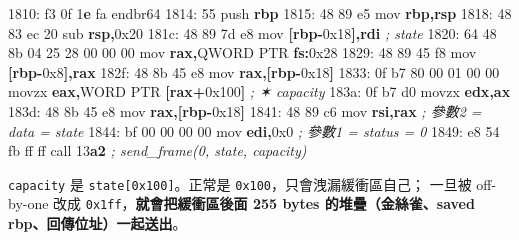\documentclass[10pt,a4paper]{article}
\newenvironment{Shaded}{\begin{snugshade}}{\end{snugshade}}
\newcommand{\BaseNTok}[1]{\textcolor[rgb]{0.00,0.00,0.81}{#1}}
\newcommand{\BuiltInTok}[1]{#1}
\newcommand{\CommentTok}[1]{\textcolor[rgb]{0.56,0.35,0.01}{\textit{#1}}}
\newcommand{\DataTypeTok}[1]{\textcolor[rgb]{0.13,0.29,0.53}{#1}}
\newcommand{\DecValTok}[1]{\textcolor[rgb]{0.00,0.00,0.81}{#1}}
\newcommand{\ErrorTok}[1]{\textcolor[rgb]{0.64,0.00,0.00}{\textbf{#1}}}
\newcommand{\FloatTok}[1]{\textcolor[rgb]{0.00,0.00,0.81}{#1}}
\newcommand{\KeywordTok}[1]{\textcolor[rgb]{0.13,0.29,0.53}{\textbf{#1}}}
\newcommand{\NormalTok}[1]{#1}
\newcommand{\OperatorTok}[1]{\textcolor[rgb]{0.81,0.36,0.00}{\textbf{#1}}}
\renewenvironment{Shaded}{%
  \def\FrameCommand{\fboxsep=3.2pt\colorbox{shadecolor}}%
  \MakeFramed{\advance\hsize-\width\FrameRestore\small}%
}{%
  \endMakeFramed
}
\begin{document}
\begin{Shaded}
\begin{Highlighting}[]
\NormalTok{1810: f3 }\FloatTok{0}\BaseNTok{f} \DecValTok{1}\ErrorTok{e}\NormalTok{ fa            endbr64}
\NormalTok{1814: 55                     }\BuiltInTok{push}   \KeywordTok{rbp}
\NormalTok{1815: 48 89 e5               mov    }\KeywordTok{rbp}\OperatorTok{,}\KeywordTok{rsp}
\NormalTok{1818: 48 83 ec }\DecValTok{20}\NormalTok{            sub    }\KeywordTok{rsp}\OperatorTok{,}\BaseNTok{0x20}
\NormalTok{181c: 48 89 7d e8            mov    }\OperatorTok{[}\KeywordTok{rbp}\OperatorTok{{-}}\BaseNTok{0x18}\OperatorTok{],}\KeywordTok{rdi}        \CommentTok{; state}
\NormalTok{1820: 64 48 8b 04 25 28 00 00 00  }\BuiltInTok{mov} \KeywordTok{rax}\OperatorTok{,}\DataTypeTok{QWORD} \DataTypeTok{PTR} \KeywordTok{fs}\OperatorTok{:}\BaseNTok{0x28}
\NormalTok{1829: 48 89 45 f8            mov    }\OperatorTok{[}\KeywordTok{rbp}\OperatorTok{{-}}\BaseNTok{0x8}\OperatorTok{],}\KeywordTok{rax}
\NormalTok{182f: 48 8b 45 e8            mov    }\KeywordTok{rax}\OperatorTok{,[}\KeywordTok{rbp}\OperatorTok{{-}}\BaseNTok{0x18}\OperatorTok{]}
\NormalTok{1833: 0f b7 }\DecValTok{80} \DecValTok{00} \DecValTok{01} \DecValTok{00} \DecValTok{00}\NormalTok{   movzx  }\KeywordTok{eax}\OperatorTok{,}\DataTypeTok{WORD} \DataTypeTok{PTR} \OperatorTok{[}\KeywordTok{rax}\OperatorTok{+}\BaseNTok{0x100}\OperatorTok{]} \CommentTok{; ✶ capacity}
\NormalTok{183a: 0f b7 d0               movzx  }\KeywordTok{edx}\OperatorTok{,}\KeywordTok{ax}
\NormalTok{183d: 48 8b 45 e8            mov    }\KeywordTok{rax}\OperatorTok{,[}\KeywordTok{rbp}\OperatorTok{{-}}\BaseNTok{0x18}\OperatorTok{]}
\NormalTok{1841: 48 89 c6               mov    }\KeywordTok{rsi}\OperatorTok{,}\KeywordTok{rax}               \CommentTok{; 參數2 = data = state}
\NormalTok{1844: bf }\DecValTok{00} \DecValTok{00} \DecValTok{00} \DecValTok{00}\NormalTok{         mov    }\KeywordTok{edi}\OperatorTok{,}\BaseNTok{0x0}               \CommentTok{; 參數1 = status = 0}
\NormalTok{1849: e8 }\DecValTok{54}\NormalTok{ fb ff ff         call   }\DecValTok{13}\ErrorTok{a2}                 \CommentTok{; send\_frame(0, state, capacity)}
\end{Highlighting}
\end{Shaded}

\texttt{capacity} 是 \texttt{state{[}0x100{]}}。正常是
\texttt{0x100}，只會洩漏緩衝區自己； 一旦被 off-by-one 改成
\texttt{0x1ff}，\textbf{就會把緩衝區後面 255 bytes 的堆疊（金絲雀、saved
rbp、回傳位址）一起送出}。
\end{document}
